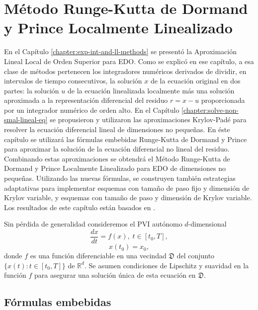 \chapter{Método Runge-Kutta de Dormand y Prince Localmente Linealizado}\label{chapter:lldp}

En el Capítulo \ref{chapter:exp-int-and-ll-methods} se presentó la Aproximación Lineal Local de Orden Superior para EDO. Como se explicó en ese capítulo, a esa clase de métodos pertenecen los integradores numéricos derivados de dividir, en intervalos de tiempo consecutivos, la solución $x$ de la ecuación original en dos partes: la solución $u$ de la ecuación linealizada localmente más una solución aproximada a la representación diferencial del residuo $r=x-u$ proporcionada por un integrador numérico de orden alto. En el Capítulo \ref{chapter:solve-non-smal-lineal-eq} se propusieron y utilizaron las aproximaciones Krylov-Padé para resolver la ecuación diferencial lineal de dimensiones no pequeñas. En éste capítulo se utilizará las fórmulas embebidas Runge-Kutta de Dormand y Prince para aproximar la solución de la ecuación diferencial no lineal del residuo. Combinando estas aproximaciones se obtendrá el Método Runge-Kutta de Dormand y Prince Localmente Linealizado para EDO de dimensiones no pequeñas. Utilizando las nuevas fórmulas, se construyen también estrategias adaptativas para implementar esquemas con tamaño de paso fijo y dimensión de Krylov variable, y esquemas con tamaño de paso y dimensión de Krylov variable. Los resultados de este capítulo están basados en \cite{naranjo2021locally}.

Sin pérdida de generalidad consideremos el PVI autónomo $d$-dimensional
\begin{equation}\label{syst}
\frac{dx}{dt}=f(x), \; t\in[t_0,T],\end{equation}
\begin{equation}\label{systcond}
x(t_0)=x_0,
\end{equation}donde $f$ es una función diferenciable en una vecindad
$\mathfrak{D}$ del conjunto $\{x(t):t\in [t_0,T]\}$ de $\mathbb{R}^{d}$. Se asumen condiciones de Lipschitz y suavidad en la función $f$ para asegurar una solución única de esta ecuación en $\mathfrak{D}$.

\section{Fórmulas embebidas}

